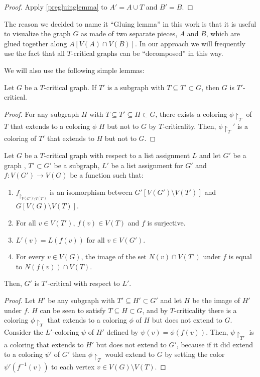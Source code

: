 \begin{proof} 
Apply \ref{pregluinglemma} to $A' = A \cup T$ and $B' = B$. 
\end{proof}

The reason we decided to name it ``Gluing lemma'' in this work is that it is useful to visualize the graph $G$ as made of two separate pieces, $A$ and $B$, which are glued together along $A[V(A) \cap V(B)]$. In our approach we will frequently use the fact that all $T$-critical graphs can be ``decomposed'' in this way. 

We will also use the following simple lemmas:

\begin{lemma}
\label{extensionlemma}
Let $G$ be a $T$-critical graph. If $T'$ is a subgraph with 
$T \subseteq T' \subset G$, then $G$ is $T'$-critical.
\end{lemma}
\begin{proof}
For any subgraph $H$ with $T \subseteq T' \subseteq H \subset G$, there exists a coloring
$\phi\restriction_T$ of $T$ that extends to a coloring $\phi$ $H$ but not to $G$ by $T$-criticality. Then, $\phi\restriction_T'$ is a coloring of $T'$ that extends to $H$ but not to $G$.
\end{proof}

\begin{lemma}
\label{duplicationlemma}
Let $G$ be a $T$-critical graph with respect to a list assignment $L$ and let $G'$ be a graph
, $T' \subset G'$ be a subgraph, $L'$ be a list assignment for $G'$ and $f : V(G') \rightarrow V(G)$ be a function such that:

\begin{enumerate}
	\item	$f_{\restriction_{V(G') \setminus V(T')}}$ is an isomorphism between 
	$G'[V(G') \setminus V(T')]$ and $G[V(G) \setminus V(T)]$.
	\item For all $v \in V(T')$, $f(v) \in V(T)$ and $f$ is surjective.  
	\item $L'(v) = L(f(v))$ for all $v \in V(G')$. 
	\item For every $v \in V(G)$, the image of the set $N(v) \cap V(T')$ under $f$
	is equal to $N(f(v)) \cap V(T)$.  
\end{enumerate}

Then, $G'$ is $T'$-critical with respect to $L'$.
 
\end{lemma}
\begin{proof}
Let $H'$ be any subgraph with $T' \subseteq H' \subset G'$ and let $H$ be the image of $H'$ under 
$f$. $H$ can be seen to satisfy $T \subseteq H \subset G$, and by $T$-criticality there is a 
coloring $\phi\restriction_T$ that extends to a coloring $\phi$ of $H$ but does not extend to $G$.
Consider the $L'$-coloring $\psi$ of $H'$ defined by $\psi(v) = \phi(f(v))$. 
Then, $\psi\restriction_{T'}$ is a coloring that extends to $H'$ but does not extend to $G'$,
because if it did extend to a coloring $\psi'$ of $G'$ 
then $\phi\restriction_T$ would extend to $G$ by setting the
color $\psi'(f^{-1}(v))$ to each vertex $v \in V(G) \setminus V(T)$. 
\end{proof}

